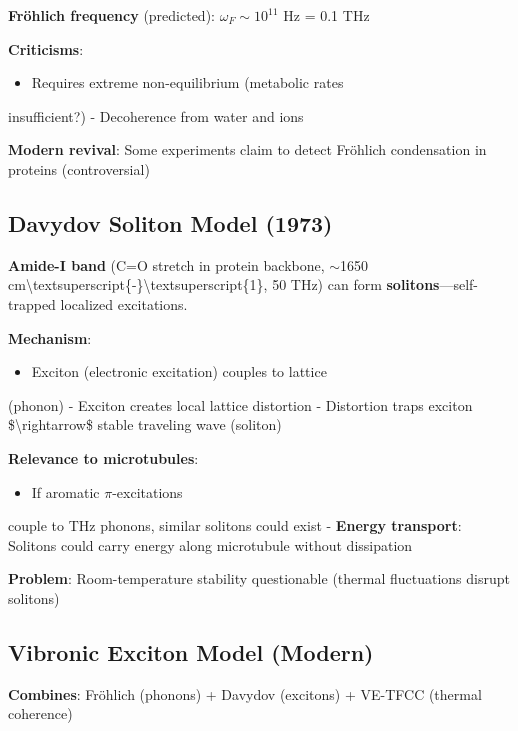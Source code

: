 \textbf{Fröhlich frequency} (predicted): \(\omega_F \sim 10^{11}\) Hz =
0.1 THz

\textbf{Criticisms}:
\begin{itemize}
\item Requires extreme non-equilibrium (metabolic rates
\end{itemize}

insufficient?) - Decoherence from water and ions

\textbf{Modern revival}: Some experiments claim to detect Fröhlich
condensation in proteins (controversial)

\subsection{Davydov Soliton Model (1973)}\label{davydov-soliton-model-1973}

\textbf{Amide-I band} (C=O stretch in protein backbone,
$\sim$1650
cm\textbackslash textsuperscript\{-\}\textbackslash textsuperscript\{1\},
50 THz) can form \textbf{solitons}---self-trapped localized
excitations.

\textbf{Mechanism}:
\begin{itemize}
\item Exciton (electronic excitation) couples to lattice
\end{itemize}

(phonon) - Exciton creates local lattice distortion - Distortion traps
exciton \$\textbackslash rightarrow\$ stable traveling wave (soliton)

\textbf{Relevance to microtubules}:
\begin{itemize}
\item If aromatic \(\pi\)-excitations
\end{itemize}

couple to THz phonons, similar solitons could exist - \textbf{Energy
transport}: Solitons could carry energy along microtubule without
dissipation

\textbf{Problem}: Room-temperature stability questionable (thermal
fluctuations disrupt solitons)

\subsection{Vibronic Exciton Model (Modern)}\label{vibronic-exciton-model-modern}

\textbf{Combines}: Fröhlich (phonons) + Davydov (excitons) + VE-TFCC
(thermal coherence)

